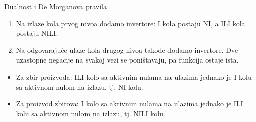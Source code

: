 \begin{frame}[label=02-s024]{Dualnost i De Morganova pravila}
\vspace{2mm}
\begin{enumerate}
\item Na izlaze kola prvog nivoa dodamo invertore: I kola postaju \alert{NI}, a ILI kola postaju \alert{NILI}.
\item Na odgovarajuće ulaze kola drugog nivoa takođe dodamo invertore. Dve uzastopne negacije na svakoj vezi se poništavaju, pa \alert{funkcija ostaje ista}.
\end{enumerate}
\par\vspace{3mm}
\vspace{2mm}
\begin{itemize}
\item Za \alert{zbir proizvoda}: ILI kolo sa aktivnim nulama na ulazima jednako je I kolu sa aktivnom nulom na izlazu, tj. \alert{NI kolu}.
\item Za \alert{proizvod zbirova}: I kolo sa aktivnim nulama na ulazima jednako je ILI kolu sa aktivnom nulom na izlazu, tj. \alert{NILI kolu}.
\end{itemize}
\end{frame}
